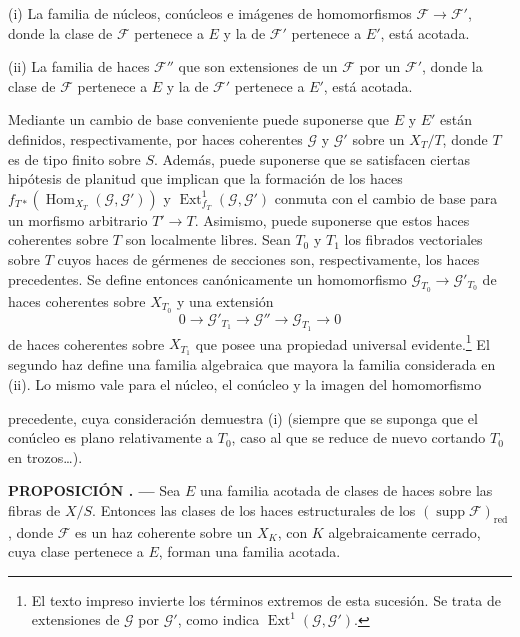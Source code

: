 \documentclass[11pt,twoside,openany]{book}
\numberwithin{equation}{section}
\newcommand{\src}[1]{%
  \phantomsection\hypertarget{src:#1}{}%
  \marginpar{\raggedleft\footnotesize\sffamily #1}%
}
\theoremstyle{plain}
\theoremstyle{definition}
\theoremstyle{remark}
\newcommand{\result}[2]{%
  \par\medskip\noindent\textbf{#1%
  \if\relax\detokenize{#2}\relax\else\space#2\fi. ---}\enspace
}
\newcommand{\FgaUnitKey}{frontmatter}
\renewcommand{\src}[1]{%
  \phantomsection\hypertarget{src:\FgaUnitKey:#1}{}%
  \marginpar{\raggedleft\footnotesize\sffamily #1}%
}
\theoremstyle{plain}
\theoremstyle{definition}
\theoremstyle{remark}
\begin{document}
\medskip
\noindent (i) La familia de núcleos, conúcleos e imágenes de homomorfismos
$\mathcal F\longrightarrow\mathcal F'$, donde la clase de $\mathcal F$
pertenece a $E$ y la de $\mathcal F'$ pertenece a $E'$, está acotada.

\smallskip
\noindent (ii) La familia de haces $\mathcal F''$ que son extensiones de un
$\mathcal F$ por un $\mathcal F'$, donde la clase de $\mathcal F$ pertenece a
$E$ y la de $\mathcal F'$ pertenece a $E'$, está acotada.

Mediante un cambio de base conveniente puede suponerse que $E$ y $E'$ están
definidos, respectivamente, por haces coherentes $\mathcal G$ y $\mathcal G'$
sobre un $X_T/T$, donde $T$ es de tipo finito sobre $S$. Además, puede
suponerse que se satisfacen ciertas hipótesis de planitud que implican que la
formación de los haces
$f_{T*}(\operatorname{Hom}_{X_T}(\mathcal G,\mathcal G'))$ y
$\operatorname{Ext}^{1}_{f_T}(\mathcal G,\mathcal G')$ conmuta con el cambio
de base para un morfismo arbitrario $T'\longrightarrow T$. Asimismo, puede
suponerse que estos haces coherentes sobre $T$ son localmente libres. Sean
$T_0$ y $T_1$ los fibrados vectoriales sobre $T$ cuyos haces de gérmenes de
secciones son, respectivamente, los haces precedentes. Se define entonces
canónicamente un homomorfismo
$\mathcal G_{T_0}\longrightarrow\mathcal G'_{T_0}$ de haces coherentes sobre
$X_{T_0}$ y una extensión
\[
0\longrightarrow\mathcal G'_{T_1}\longrightarrow\mathcal G''
\longrightarrow\mathcal G_{T_1}\longrightarrow0
\]
de haces coherentes sobre $X_{T_1}$ que posee una propiedad universal
evidente.\footnote{El texto impreso invierte los términos extremos de esta sucesión. Se trata de extensiones de $\mathcal G$ por $\mathcal G'$, como indica $\operatorname{Ext}^1(\mathcal G,\mathcal G')$.} El segundo haz define una familia algebraica que mayora la familia
considerada en (ii). Lo mismo vale para el núcleo, el conúcleo y la imagen del
homomorfismo
\src{253}
precedente, cuya consideración demuestra (i) (siempre que se suponga que el
conúcleo es plano relativamente a $T_0$, caso al que se reduce de nuevo
cortando $T_0$ en trozos\ldots).

\result{PROPOSICIÓN}{1.3} Sea $E$ una familia acotada de clases de haces sobre
las fibras de $X/S$. Entonces las clases de los haces estructurales de los
$(\operatorname{supp}\mathcal F)_{\mathrm{red}}$, donde $\mathcal F$ es un
haz coherente sobre un $X_K$, con $K$ algebraicamente cerrado, cuya clase
pertenece a $E$, forman una familia acotada.
\end{document}
